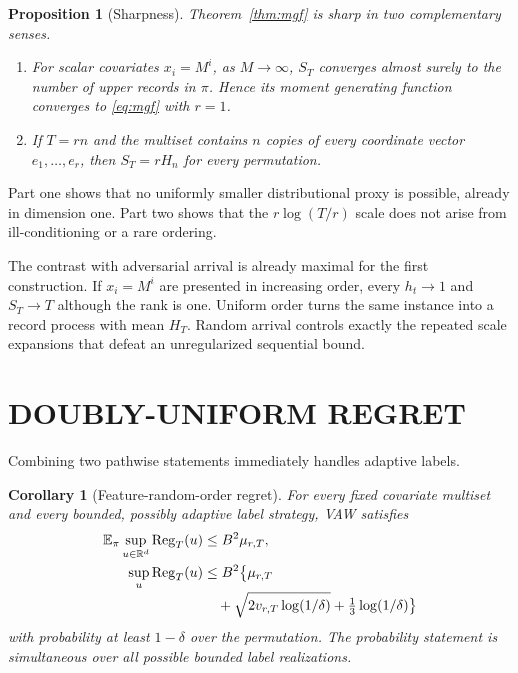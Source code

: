 \documentclass[twoside]{article}
\newtheorem{proposition}[theorem]{Proposition}
\newtheorem{corollary}[theorem]{Corollary}
\newcommand{\E}{\mathbb E}
\newcommand{\R}{\mathbb R}
\newcommand{\Reg}{\operatorname{Reg}}
\begin{document}
\begin{proposition}[Sharpness]
\label{prop:sharpness}
Theorem~\ref{thm:mgf} is sharp in two complementary senses.
\begin{enumerate}[leftmargin=*,itemsep=2pt]
\item For scalar covariates $x_i=M^i$, as $M\to\infty$, $S_T$ converges almost surely to the number of upper records in $\pi$. Hence its moment generating function converges to \eqref{eq:mgf} with $r=1$.
\item If $T=rn$ and the multiset contains $n$ copies of every coordinate vector $e_1,\ldots,e_r$, then $S_T=rH_n$ for every permutation.
\end{enumerate}
\end{proposition}

Part one shows that no uniformly smaller distributional proxy is possible, already in dimension one. Part two shows that the $r\log(T/r)$ scale does not arise from ill-conditioning or a rare ordering.

The contrast with adversarial arrival is already maximal for the first construction. If $x_i=M^i$ are presented in increasing order, every $h_t\to1$ and $S_T\to T$ although the rank is one. Uniform order turns the same instance into a record process with mean $H_T$. Random arrival controls exactly the repeated scale expansions that defeat an unregularized sequential bound.

\section{DOUBLY-UNIFORM REGRET}
\label{sec:regret}

Combining two pathwise statements immediately handles adaptive labels.

\begin{corollary}[Feature-random-order regret]
\label{cor:regret}
For every fixed covariate multiset and every bounded, possibly adaptive label strategy, VAW satisfies
\begin{align}
 \E_\pi\sup_{u\in\R^d}\Reg_T(u)
 &\le B^2\mu_{r,T},
 \label{eq:expected-regret}\\
 \sup_u\Reg_T(u)
 &\le B^2\bigl\{\mu_{r,T}\notag\\[-2pt]
 &\quad+\sqrt{2v_{r,T}\log(1/\delta)}
 +\tfrac13\log(1/\delta)\bigr\}
 \label{eq:hp-regret}
\end{align}
with probability at least $1-\delta$ over the permutation. The probability statement is simultaneous over all possible bounded label realizations.
\end{corollary}
\end{document}
